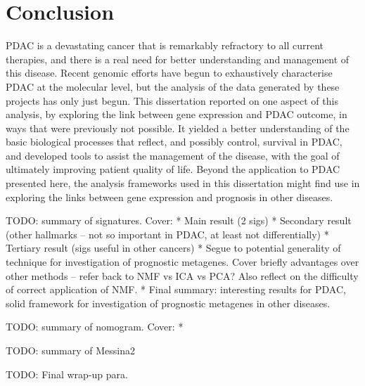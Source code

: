 \documentclass[thesis.tex]{subfiles}
\begin{document}
\chapter[Conclusion]{Conclusion}
\label{chap:conc}

\acrlong{PDAC} is a devastating cancer that is remarkably refractory to all current therapies, and there is a real need for better understanding and management of this disease.  Recent genomic efforts have begun to exhaustively characterise \gls{PDAC} at the molecular level, but the analysis of the data generated by these projects has only just begun.  This dissertation reported on one aspect of this analysis, by exploring the link between gene expression and \gls{PDAC} outcome, in ways that were previously not possible.  It yielded a better understanding of the basic biological processes that reflect, and possibly control, survival in \gls{PDAC}, and developed tools to assist the management of the disease, with the goal of ultimately improving patient quality of life.  Beyond the application to \gls{PDAC} presented here, the analysis frameworks used in this dissertation might find use in exploring the links between gene expression and prognosis in other diseases.

TODO: summary of signatures.  Cover:
  * Main result (2 sigs)
  * Secondary result (other hallmarks -- not so important in PDAC, at least not differentially)
  * Tertiary result (sigs useful in other cancers)
  * Segue to potential generality of technique for investigation of prognostic metagenes.  Cover briefly advantages over other methods -- refer back to NMF vs ICA vs PCA?  Also reflect on the difficulty of correct application of NMF.
  * Final summary: interesting results for PDAC, solid framework for investigation of prognostic metagenes in other diseases.

TODO: summary of nomogram.  Cover:
  * 
  
TODO: summary of Messina2

TODO: Final wrap-up para.
\end{document}
